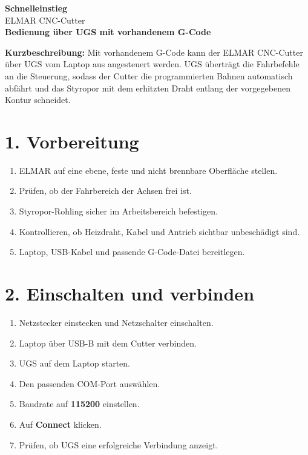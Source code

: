 \documentclass[10pt,a4paper]{article}
\begin{document}
	
	\begin{center}
		{\Huge \textbf{Schnelleinstieg}}\\
		\vspace{0.2em}
		{\LARGE ELMAR CNC-Cutter}\\
		\vspace{0.4em}
		\textbf{Bedienung über UGS mit vorhandenem G-Code}
	\end{center}
	
	\vspace{0.5em}
	
	\textbf{Kurzbeschreibung:}  
	Mit vorhandenem G-Code kann der ELMAR CNC-Cutter über UGS vom Laptop aus angesteuert werden. UGS überträgt die Fahrbefehle an die Steuerung, sodass der Cutter die programmierten Bahnen automatisch abfährt und das Styropor mit dem erhitzten Draht entlang der vorgegebenen Kontur schneidet.
	
	\vspace{0.5em}
	
	\section*{1. Vorbereitung}
	
	\begin{enumerate}
		\item ELMAR auf eine ebene, feste und nicht brennbare Oberfläche stellen.
		\item Prüfen, ob der Fahrbereich der Achsen frei ist.
		\item Styropor-Rohling sicher im Arbeitsbereich befestigen.
		\item Kontrollieren, ob Heizdraht, Kabel und Antrieb sichtbar unbeschädigt sind.
		\item Laptop, USB-Kabel und passende G-Code-Datei bereitlegen.
	\end{enumerate}
	
	\section*{2. Einschalten und verbinden}
	
	\begin{enumerate}
		\item Netzstecker einstecken und Netzschalter einschalten.
		\item Laptop über USB-B mit dem Cutter verbinden.
		\item UGS auf dem Laptop starten.
		\item Den passenden COM-Port auswählen.
		\item Baudrate auf \textbf{115200} einstellen.
		\item Auf \textbf{Connect} klicken.
		\item Prüfen, ob UGS eine erfolgreiche Verbindung anzeigt.
	\end{enumerate}
	
\end{document}
